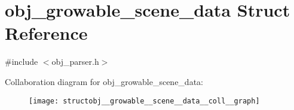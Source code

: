 \hypertarget{structobj__growable__scene__data}{\section{obj\+\_\+growable\+\_\+scene\+\_\+data Struct Reference}
\label{structobj__growable__scene__data}
}


{\ttfamily \#include $<$obj\+\_\+parser.\+h$>$}



Collaboration diagram for obj\+\_\+growable\+\_\+scene\+\_\+data\+:\nopagebreak
\begin{figure}[H]
\begin{center}
\leavevmode
\texttt{[image: structobj\_\_growable\_\_scene\_\_data\_\_coll\_\_graph]}
\end{center}
\end{figure}
